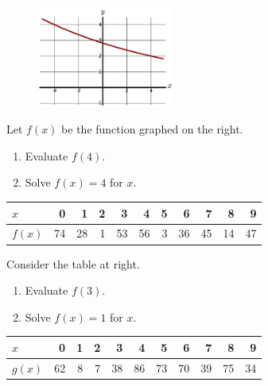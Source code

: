 \begin{enumerate}
\vspace{120pt}

\begin{minipage}{\linewidth}
\begin{figure}
    \centering
    \vspace{-36pt}
    \includegraphics[width=0.4\textwidth]{img/chap1/sec1-2/prob8.png}
\end{figure}

\item Let $f(x)$ be the function graphed on the right.
    \begin{enumerate}
        \item Evaluate $f(4)$.
        \item Solve $f(x) = 4$ for $x$.
    \end{enumerate}
\end{minipage}


\vspace{120pt}

\begin{minipage}{\linewidth}
\begin{table}
    \centering
    \vspace{-12pt}
    \begin{longtable}[]{@{}lrrrrrrrrrr@{}}
    \toprule
    $x$ & 0 & 1 & 2 & 3 & 4 & 5 & 6 & 7 & 8 & 9\tabularnewline
    \midrule
    \endhead
    $f(x)$ & 74 & 28 & 1 & 53 & 56 & 3 & 36 & 45 & 14 & 47\tabularnewline
    \bottomrule
    \end{longtable}
\end{table}

\item Consider the table at right.
    \begin{enumerate}
        \item Evaluate $f(3)$.
        \item Solve $f(x) = 1$ for $x$.
    \end{enumerate}
\end{minipage}

\begin{minipage}{\linewidth}
\begin{table}
    \centering
    \vspace{-12pt}
    \begin{longtable}[]{@{}lrrrrrrrrrr@{}}
    \toprule
    $x$ & 0 & 1 & 2 & 3 & 4 & 5 & 6 & 7 & 8 & 9\tabularnewline
    \midrule
    \endhead
    $g(x)$ & 62 & 8 & 7 & 38 & 86 & 73 & 70 & 39 & 75 & 34\tabularnewline
    \bottomrule
    \end{longtable}
\end{table}


\end{minipage}
\end{enumerate}
